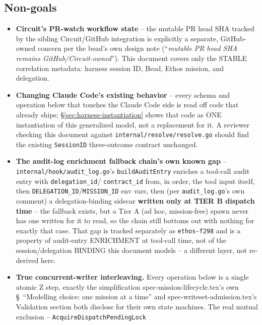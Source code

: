 \documentclass[a4paper,10pt,fleqn]{article}
\newcommand{\fpath}[1]{\texttt{#1}}
\newcommand{\field}[1]{\texttt{#1}}
\begin{document}
\subsection{Non-goals}
\label{sec:nongoals}

\begin{itemize}
  \item \textbf{Circuit's PR-watch workflow state} -- the mutable PR
    head SHA tracked by the sibling Circuit/GitHub integration is
    explicitly a separate, GitHub-owned concern per the bead's own
    design note (``\emph{mutable PR head SHA remains GitHub/Circuit-owned}'').
    This document covers only the STABLE correlation metadata: harness
    session ID, Bead, Ethos mission, and delegation.
  \item \textbf{Changing Claude Code's existing behavior} -- every
    schema and operation below that touches the Claude Code side is
    read off code that already ships; \S\ref{sec:harness-instantiation}
    shows that code as ONE instantiation of this generalized model, not
    a replacement for it. A reviewer checking this document against
    \fpath{internal/resolve/resolve.go} should find the existing
    \field{SessionID} three-outcome contract unchanged.
  \item \textbf{The audit-log enrichment fallback chain's own known gap}
    -- \fpath{internal/hook/audit\_log.go}'s \field{buildAuditEntry}
    enriches a tool-call audit entry with \field{delegation\_id}/
    \field{contract\_id} from, in order, the tool input itself, then
    \field{DELEGATION\_ID}/\field{MISSION\_ID} env vars, then (per
    \fpath{audit\_log.go}'s own comment) a delegation-binding sidecar
    \textbf{written only at TIER B dispatch time} -- the fallback exists,
    but a Tier A (ad hoc, mission-free) spawn never has one written for
    it to read, so the chain still bottoms out with nothing for exactly
    that case. That gap is tracked separately as \field{ethos-f298} and
    is a property of audit-entry ENRICHMENT at tool-call time, not of
    the session/delegation BINDING this document models -- a different
    layer, not re-derived here.
  \item \textbf{True concurrent-writer interleaving.} Every operation
    below is a single atomic Z step, exactly the simplification
    spec-mission-lifecycle.tex's own \S~``Modelling choice: one mission
    at a time'' and spec-writeset-admission.tex's Validation section
    both disclose for their own state machines. The real mutual
    exclusion -- \field{AcquireDispatchPendingLock}

\end{itemize}
\end{document}
